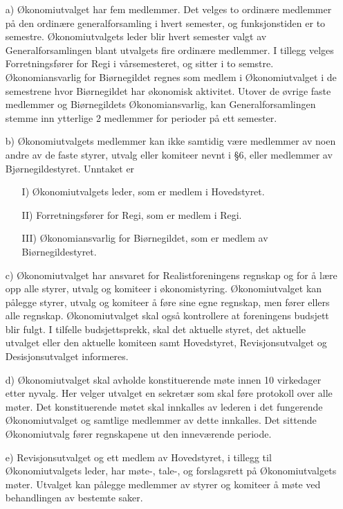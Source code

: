\begin{itemize}
\item[a)] Økonomiutvalget har fem medlemmer. Det velges to
  ordinære medlemmer på den
ordinære generalforsamling i hvert semester, og funksjonstiden er to
semestre.  Økonomiutvalgets leder blir hvert semester valgt av
Generalforsamlingen blant utvalgets fire ordinære medlemmer. I
  tillegg velges Forretningsfører for Regi i vårsemesteret, og
  sitter i to semstre. 
  Økonomiansvarlig for Biørnegildet regnes som medlem i Økonomiutvalget
  i de semestrene hvor Biørnegildet har økonomisk aktivitet. Utover de
  øvrige faste medlemmer og Biørnegildets Økonomiansvarlig, kan
  Generalforsamlingen stemme inn ytterlige 2 medlemmer for perioder på
  ett semester.

\item[b)] Økonomiutvalgets medlemmer kan ikke samtidig være medlemmer av noen
andre av de faste styrer, utvalg eller komiteer nevnt i §6, eller
medlemmer av Bjørnegildestyret. Unntaket er

\begin{itemize}
    \item[I)] Økonomiutvalgets leder, som er medlem i Hovedstyret.
    \item[II)] Forretningsfører for Regi, som er medlem i Regi.
    \item[III)] Økonomiansvarlig for Biørnegildet, som er medlem av 
        Biørnegildestyret.
\end{itemize}

\item[c)] Økonomiutvalget har ansvaret for Realistforeningens regnskap og
for å lære opp alle styrer, utvalg og komiteer i økonomistyring.
Økonomiutvalget kan pålegge styrer, utvalg og komiteer å føre sine
egne regnskap, men fører ellers alle regnskap.  Økonomiutvalget skal
også kontrollere at foreningens budsjett blir fulgt.  I tilfelle
budsjettsprekk, skal det aktuelle styret, det aktuelle utvalget
eller den aktuelle komiteen samt Hovedstyret, Revisjonsutvalget og
Desisjonsutvalget informeres.

\item[d)] Økonomiutvalget skal avholde konstituerende møte innen 10 virkedager
etter nyvalg. Her velger utvalget en sekretær som skal føre protokoll
over alle møter.  Det konstituerende møtet skal innkalles av lederen i
det fungerende Økonomiutvalget og samtlige medlemmer av dette
innkalles.  Det sittende Økonomiutvalg fører regnskapene ut den 
inneværende periode.

\item[e)] Revisjonsutvalget og ett medlem av Hovedstyret, i tillegg til
Økonomiutvalgets leder, har møte-, tale-, og forslagsrett på
Økonomiutvalgets møter. Utvalget kan pålegge medlemmer av styrer og
komiteer å møte ved behandlingen av bestemte saker.


\end{itemize}
